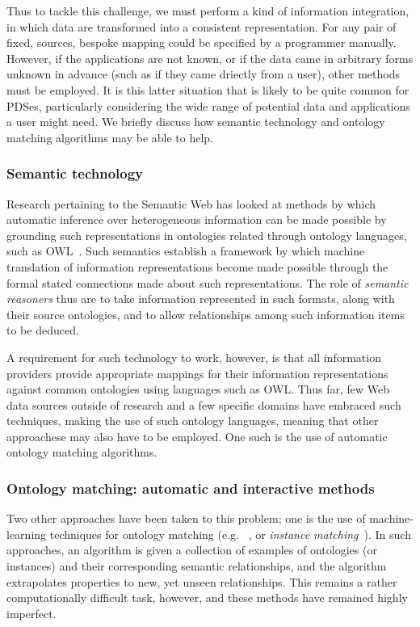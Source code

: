 \documentclass[graybox]{svmult}
\begin{document}
Thus to tackle this challenge, we must perform a kind of information integration, in which data are transformed into a consistent representation.  For any pair of fixed, sources, bespoke mapping could be specified by a programmer manually.  However, if the applications are not known, or if the data came in arbitrary forms unknown in advance (such as if they came driectly from a user), other methods must be employed.  It is this latter situation that is likely to be quite common for PDSes, particularly considering the wide range of potential data and applications a user might need.  We briefly discuss how semantic technology and ontology matching algorithms may be able to help.

\subsubsection{Semantic technology}

Research pertaining to the Semantic Web\emph{} has looked at methods by which automatic inference over heterogeneous information can be made possible by grounding such representations in ontologies related through ontology languages, such as OWL~\cite{antoniou2004web}.  Such semantics establish a framework by which machine translation of information representations become made possible through the formal stated connections made about such representations.  The role of \emph{semantic reasoners} thus are to take information represented in such formats, along with their source ontologies, and to allow relationships among such information items to be deduced. 

A requirement for such technology to work, however, is that all information providers provide appropriate mappings for their information representations against common ontologies using languages such as OWL.  Thus far, few Web data sources outside of research and a few specific domains have embraced such techniques, making the use of such ontology languages, meaning that other approachese may also have to be employed. One such is the use of automatic ontology matching algorithms.

\subsubsection{Ontology matching: automatic and interactive methods}
Two other approaches have been taken to this problem; one is the use of machine-learning techniques for ontology matching (e.g. ~\cite{euzenat2004api,doan2003learning}, or \emph{instance matching}~\cite{suchanek2011paris,castano2006matching}).  In such approaches, an algorithm is given a collection of examples of ontologies (or instances) and their corresponding semantic relationships, and the algorithm extrapolates properties to new, yet unseen relationships.  This remains a rather computationally difficult task, however, and these methods have remained highly imperfect.
\end{document}
